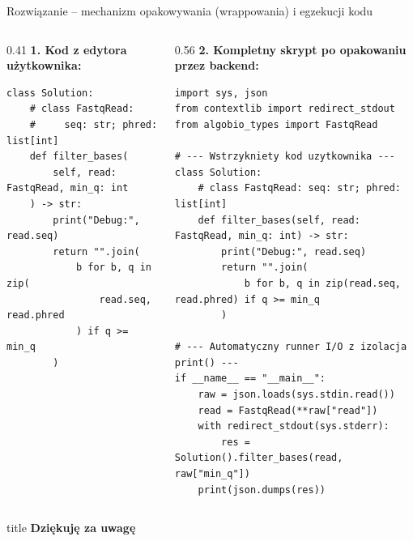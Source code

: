 \documentclass[9pt,aspectratio=169]{beamer}
\begin{document}
\begin{frame}[fragile]{Rozwiązanie -- mechanizm opakowywania (wrappowania) i egzekucji kodu}
    \vspace{-3pt}
    \begin{columns}[T,onlytextwidth]
        \begin{column}{0.41\textwidth}
            \textbf{\scriptsize 1. Kod z edytora użytkownika:}
            \begin{lstlisting}[basicstyle=\ttfamily\fontsize{6.0}{7.4}\selectfont]
class Solution:
    # class FastqRead:
    #     seq: str; phred: list[int]
    def filter_bases(
        self, read: FastqRead, min_q: int
    ) -> str:
        print("Debug:", read.seq)
        return "".join(
            b for b, q in zip(
                read.seq, read.phred
            ) if q >= min_q
        )
            \end{lstlisting}
        \end{column}

        \begin{column}{0.56\textwidth}
            \textbf{\scriptsize 2. Kompletny skrypt po opakowaniu przez backend:}
            \begin{lstlisting}[basicstyle=\ttfamily\fontsize{6.0}{7.4}\selectfont]
import sys, json
from contextlib import redirect_stdout
from algobio_types import FastqRead

# --- Wstrzykniety kod uzytkownika ---
class Solution:
    # class FastqRead: seq: str; phred: list[int]
    def filter_bases(self, read: FastqRead, min_q: int) -> str:
        print("Debug:", read.seq)
        return "".join(
            b for b, q in zip(read.seq, read.phred) if q >= min_q
        )

# --- Automatyczny runner I/O z izolacja print() ---
if __name__ == "__main__":
    raw = json.loads(sys.stdin.read())
    read = FastqRead(**raw["read"])
    with redirect_stdout(sys.stderr):
        res = Solution().filter_bases(read, raw["min_q"])
    print(json.dumps(res))
            \end{lstlisting}
        \end{column}
    \end{columns}
\end{frame}

\begin{frame}
    \centering
    \vspace{1.2cm}
    \begin{beamercolorbox}[sep=14pt,center,shadow=true,rounded=true]{title}
        {\LARGE \textbf{Dziękuję za uwagę}}\\[8pt]
    \end{beamercolorbox}
\end{frame}
\end{document}
